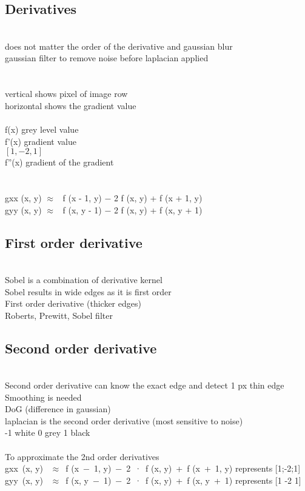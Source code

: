 \documentclass[11pt]{article}
\begin{document}
\subsection*{Derivatives}\\
does not matter the order of the derivative and gaussian blur\\
gaussian filter to remove noise before laplacian applied\\
\\\\
vertical shows pixel of image row\\
horizontal shows the gradient value \\
\\
f(x) grey level value\\
f'(x) gradient value\\
$[1,-2,1]$\\
f''(x) gradient of the gradient \\
\\\\
gxx (x, y) $\approx$  f (x - 1, y) − 2 \cdot f (x, y) + f (x + 1, y)\\
gyy (x, y) $\approx$  f (x, y - 1) − 2 \cdot f (x, y) + f (x, y + 1)
\\
\subsection*{First order derivative}\\
Sobel is a combination of derivative kernel\\
Sobel results in wide edges as it is first order\\
First order derivative (thicker edges)\\
Roberts, Prewitt, Sobel filter
\\
\subsection*{Second order derivative}\\
Second order derivative can know the exact edge and detect 1 px thin edge
Smoothing is needed\\
DoG (difference in gaussian)\\
laplacian is the second order derivative (most sensitive to noise)\\
-1 white 0 grey 1 black
\\
\\
To approximate the 2nd order derivatives\\
gxx (x, y)  $\approx$ f (x − 1, y) − 2 · f (x, y) + f (x + 1, y) 
represents [1;-2;1]
\\
gyy (x, y)  $\approx$ f (x, y − 1) − 2 · f (x, y) + f (x, y + 1)
represents [1 -2 1]
\\\\
\\\\
\end{document}
